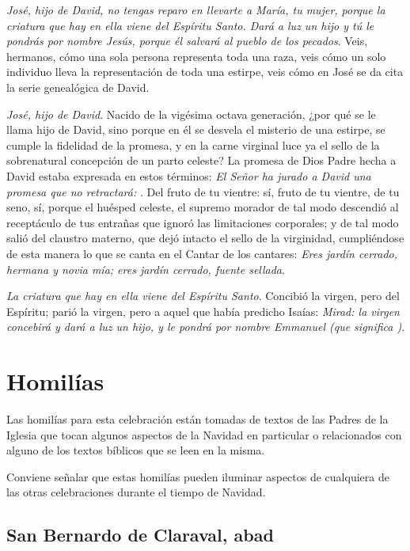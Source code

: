 \emph{José, hijo de David, no tengas reparo en llevarte a María, tu mujer, porque la criatura que hay en ella viene del Espíritu Santo. Dará a luz un hijo y tú le pondrás por nombre Jesús, porque él salvará al pueblo de los pecados}. Veis, hermanos, cómo una sola persona representa toda una raza, veis cómo un solo individuo lleva la representación de toda una estirpe, veis cómo en José se da cita la serie genealógica de David.

\emph{José, hijo de David}. Nacido de la vigésima octava generación, ¿por qué se le llama hijo de David, sino porque en él se desvela el misterio de una estirpe, se cumple la fidelidad de la promesa, y en la carne virginal luce ya el sello de la sobrenatural concepción de un parto celeste? La promesa de Dios Padre hecha a David estaba expresada en estos términos: \emph{El Señor ha jurado a David una promesa que no retractará: }. Del fruto de tu vientre: sí, fruto de tu vientre, de tu seno, sí, porque el huésped celeste, el supremo morador de tal modo descendió al receptáculo de tus entrañas que ignoró las limitaciones corporales; y de tal modo salió del claustro materno, que dejó intacto el sello de la virginidad, cumpliéndose de esta manera lo que se canta en el Cantar de los cantares: \emph{Eres jardín cerrado, hermana y novia mía; eres jardín cerrado, fuente sellada}.

\emph{La criatura que hay en ella viene del Espíritu Santo}. Concibió la virgen, pero del Espíritu; parió la virgen, pero a aquel que había predicho Isaías: \emph{Mirad: la virgen concebirá y dará a luz un hijo, y le pondrá por nombre Emmanuel (que significa )}.


\section{Homilías}

Las homilías para esta celebración están tomadas de textos de las Padres de la Iglesia que tocan algunos aspectos de la Navidad en particular o relacionados con alguno de los textos bíblicos que se leen en la misma.

Conviene señalar que estas homilías pueden iluminar aspectos de cualquiera de las otras celebraciones durante el tiempo de Navidad.

\subsection{San Bernardo de Claraval, abad}

